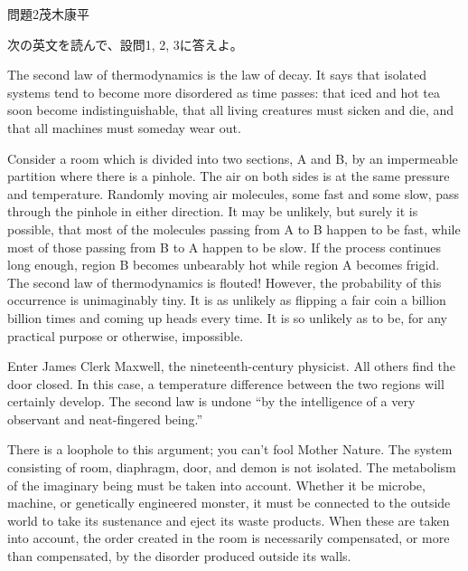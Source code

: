\documentclass[fleqn]{jbook}
\begin{document}
\begin{question}{問題2}{茂木康平}

次の英文を読んで、設問1, 2, 3に答えよ。

{\parindent=10pt
The second law of thermodynamics is the law of decay. It says that isolated systems tend to become more disordered as time passes: that iced and hot tea soon become indistinguishable, that all living creatures must sicken and die, and that all machines must someday wear out.

Consider a room which is divided into two sections, A and B, by an impermeable partition where there is a pinhole. The air on both sides is at the same pressure and temperature. Randomly moving air molecules, some fast and some slow, pass through the pinhole in either direction. It may be unlikely, but surely it is possible, that most of the molecules passing from A to B happen to be fast, while most of those passing from B to A happen to be slow. If the process continues long enough, region B becomes unbearably hot while region A becomes frigid. The second law of thermodynamics is flouted! However, the probability of this occurrence is unimaginably tiny. It is as unlikely as flipping a fair coin a billion billion times and coming up heads every time. It is so unlikely as to be, for any practical purpose or otherwise, impossible.

Enter James Clerk Maxwell, the nineteenth-century physicist.  All others find the door closed. In this case, a temperature difference between the two regions will certainly develop. The second law is undone ``by the intelligence of a very observant and neat-fingered being.''

There is a loophole to this argument; you can't fool Mother Nature. The system consisting of room, diaphragm, door, and demon is not isolated. The metabolism of the imaginary being must be taken into account. Whether it be microbe, machine, or genetically engineered monster, it must be connected to the outside world to take its sustenance and eject its waste products. When these are taken into account, the order created in the room is necessarily compensated, or more than compensated, by the disorder produced outside its walls.
}


\end{question}
\end{document}
